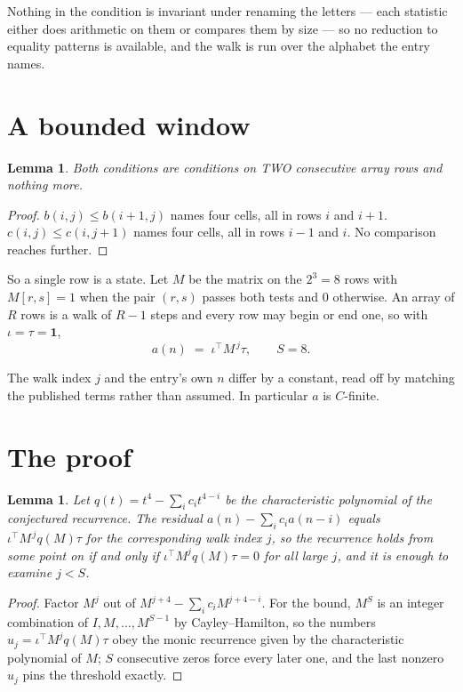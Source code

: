 \documentclass[11pt,a4paper]{article}
\theoremstyle{plain}
\newtheorem{lemma}[theorem]{Lemma}
\theoremstyle{definition}
\begin{document}
Nothing in the condition is invariant under renaming the letters --- each statistic either does
arithmetic on them or compares them by size --- so no reduction to equality patterns is
available, and the walk is run over the alphabet the entry names.

\section{A bounded window}

\begin{lemma}\label{lem:win}
Both conditions are conditions on TWO consecutive array rows and nothing more.
\end{lemma}

\begin{proof}
$b(i,j)\le b(i{+}1,j)$ names four cells, all in rows $i$ and $i+1$. $c(i,j)\le c(i,j{+}1)$
names four cells, all in rows $i-1$ and $i$. No comparison reaches further.
\end{proof}

So a single row is a state. Let $M$ be the matrix on the $2^{3}=8$ rows with
$M[r,s]=1$ when the pair $(r,s)$ passes both tests and $0$ otherwise. An array of $R$ rows is a
walk of $R-1$ steps and every row may begin or end one, so with $\iota=\tau=\mathbf{1}$,
\[
a(n)\;=\;\iota^{\!\top}M^{\,j}\tau ,\qquad S=8.
\]

The walk index $j$ and the entry's own $n$ differ by a constant, read off by matching the
published terms rather than assumed. In particular $a$ is $C$-finite.

\section{The proof}

\begin{lemma}\label{lem:crit}
Let $q(t)=t^{4}-\sum_i c_it^{4-i}$ be the characteristic polynomial of the
conjectured recurrence. The residual $a(n)-\sum_ic_ia(n-i)$ equals
$\iota^{\!\top}M^{\,j}q(M)\tau$ for the corresponding walk index $j$, so the recurrence
holds from some point on if and only if $\iota^{\!\top}M^{j}q(M)\tau=0$ for all large $j$,
and it is enough to examine $j<S$.
\end{lemma}

\begin{proof}
Factor $M^{j}$ out of $M^{j+4}-\sum_ic_iM^{j+4-i}$. For the bound, $M^{S}$
is an integer combination of $I,M,\dots,M^{S-1}$ by Cayley--Hamilton, so the numbers
$u_j=\iota^{\!\top}M^{j}q(M)\tau$ obey the monic recurrence given by the characteristic
polynomial of $M$; $S$ consecutive zeros force every later one, and the last nonzero $u_j$
pins the threshold exactly.
\end{proof}
\end{document}
